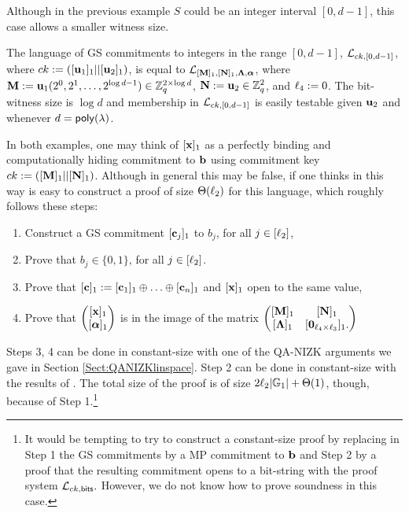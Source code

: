 Although in the previous example $S$ could be an integer interval $[0,d-1]$, this case allows a smaller witness size.

\begin{example}
The language of GS commitments to integers in the range $[0,d-1]$, $\mathcal{L}_{ck,[0,d-1]}$, where $ck:=([\mathbf{u}_1]_1||[\mathbf{u}_2]_1)$, is equal to $\mathcal{L}_{[\mathbf{{M}}]_1,[\mathbf{{N}}]_1,\mathbf{{\Lambda}},{\boldsymbol \alpha}}$, where
$\mathbf{{M}}:=\mathbf{u}_1(2^0,2^1,\ldots,2^{\log d-1})\in\mathbb{Z}_q^{2\times \log d}$, $\mathbf{{N}}:=\mathbf{u}_2\in\mathbb{Z}_q^{2}$, and ${\ell_4}:=0$. The bit-witness size is $\log d$ and membership in $\mathcal{L}_{ck,[0,d-1]}$ is easily testable given $\mathbf{u}_2$ and whenever $d=\mathsf{poly}(\lambda)$. 
\end{example}

In both examples, one may think of $[\mathbf{x}]_1$ as a perfectly binding and computationally hiding commitment to $\mathbf{b}$ using commitment key $ck:=([\mathbf{{M}}]_1||[\mathbf{{N}}]_1)$. Although in general this may be false, if one thinks in this way is easy to construct a proof of size $\Theta({\ell_2})$ for this language,  which roughly follows these steps:
\begin{enumerate}
\item Construct a GS commitment $[\mathbf{c}_j]_1$ to $b_j$, for all $j \in [{\ell_2}]$,
\item Prove that $b_j \in \{0,1\}$, for all $j \in [{\ell_2}]$.
\item Prove that $[\mathbf{c}]_1:=[\mathbf{c}_1]_1 \oplus \ldots \oplus [\mathbf{c}_n]_1$ and $[\mathbf{x}]_1$ open to the same value,
\item Prove that $\pmatri
{
    [\vecb{x}]_1\\
    [\grkb{\alpha}]_1
}$ is in the image of the matrix $
\begin{pmatrix}
    [\matr{M}]_1       & [\matr{N}]_1\\
    [\matr{\Lambda}]_1 & [\matr{0}_{\ld\times \lc}]_1.
    \end{pmatrix}$
\end{enumerate}

Steps 3, 4 can be done in constant-size with one of the QA-NIZK arguments we gave in Section \ref{Sect:QANIZKlinspace}. Step 2 can be done in constant-size with the results of \cite{AC:GonHevRaf15}. The total size of the proof is of size $2{\ell_2}|\mathbb{G}_1|+\Theta(1)$, though, because 
of Step 1.\footnote{It would be tempting to try to construct a constant-size proof by replacing in Step 1 the GS commitments by a MP commitment to $\mathbf{b}$ and Step 2 by a proof that the resulting commitment opens to a bit-string with the proof system $\mathcal{L}_{ck,\mathsf{bits}}.$ However, we do not know how to prove soundness in this case.}

